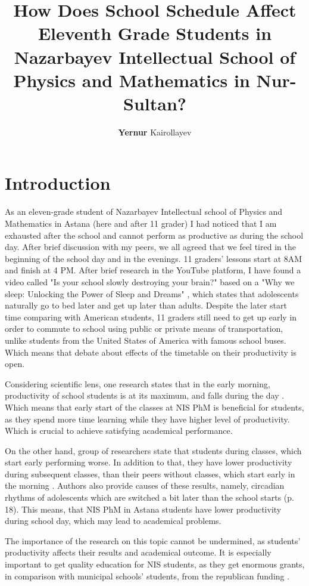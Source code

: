\documentclass[12pt,a4paper,stu, donotrepeattitle, floatsintext]{apa7}
\title{\large{How Does School Schedule Affect Eleventh Grade Students in Nazarbayev Intellectual School of Physics and Mathematics in Nur-Sultan?}}
\author{\textbf{Yernur} Kairollayev}
\affiliation{Nazarbayev Intellectual School of Physics and Mathematics}
\begin{document}
\maketitle
\section{Introduction}
As an eleven-grade student of Nazarbayev Intellectual school of Physics and Mathematics in Astana (here and after 11 grader) I had noticed that I am exhausted after the school and cannot perform as productive as during the school day. After brief discussion with my peers, we all agreed that we feel tired in the beginning of the school day and in the evenings. 11 graders’ lessons start at 8AM and finish at 4 PM. After brief research in the YouTube platform, I have found a video called "Is your school slowly destroying your brain?" \cite{youtube} based on a "Why we sleep: Unlocking the Power of Sleep and Dreams" \cite{Walker2017}, which states that adolescents naturally go to bed later and get up later than adults. Despite the later start time comparing with American students, 11 graders still need to get up early in order to commute to school using public or private means of transportation, unlike students from the United States of America with famous school buses. Which means that debate about effects of the timetable on their productivity is open.

Considering scientific lens, one research states that in the early morning, productivity of school students is at its maximum, and falls during the day \cite[p. 10]{Pope2016}. Which means that early start of the classes at NIS PhM is beneficial for students, as they spend more time learning while they have higher level of productivity. Which is crucial to achieve satisfying academical performance.

On the other hand, group of researchers state that students during classes, which start early performing worse. In addition to that, they have lower productivity during subsequent classes, than their peers without classes, which start early in the morning \cite{Carell2018}. Authors also provide causes of these results, namely, circadian rhythms of adolescents which are switched a bit later than the school starts (p. 18).  This means, that NIS PhM in Astana students have lower productivity during school day, which may lead to academical problems.

The importance of the research on this topic cannot be undermined, as students’ productivity affects their results and academical outcome. It is especially important to get quality education for NIS students, as they get enormous grants, in comparison with municipal schools’ students, from the republican funding \cite{Massimov_res, zakon_2020}.
\end{document}
